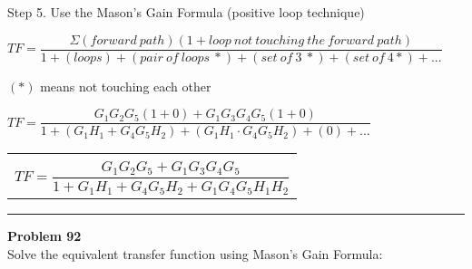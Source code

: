 \documentclass[11pt,letterpaper]{article}
\begin{document}
Step 5. Use the Mason’s Gain Formula (positive loop technique)\\
\begin{center}
	$TF=\dfrac{\Sigma (forward~path)(1 + loop~not~touching~the~forward~path)}{1 + (loops) + (pair~of~loops~*) + (set~of~3~*) + (set~of~4*) + ...}$
\end{center}
$(*)$ means not touching each other\\
\begin{center}
	$TF=\dfrac{G_1G_2G_5(1+0)+G_1G_3G_4G_5(1+0)}{1+(G_1H_1+G_4G_5H_2)+(G_1H_1\cdot G_4G_5H_2)+(0)+...}$\\[12pt]
	\begin{tabular}{|c|}
		\hline \\
	$TF=\dfrac{G_1G_2G_5+G_1G_3G_4G_5}{1+G_1H_1+G_4G_5H_2+G_1G_4G_5H_1H_2}$\\[12pt]
	\hline
	\end{tabular}
\end{center}


\clearpage

\rule{\textwidth}{1pt}
\textbf{Problem 92}\\
Solve the equivalent transfer function using Mason’s Gain Formula:\\
\end{document}
